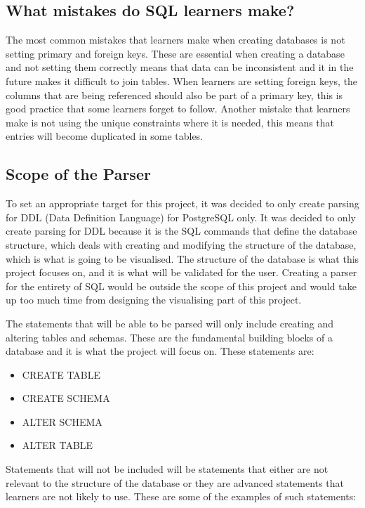\subsection{What mistakes do SQL learners make?}

The most common mistakes that learners make when creating databases is not setting primary and foreign keys. These are essential when creating a database and not setting them correctly means that data can be inconsistent and it in the future makes it difficult to join tables. When learners are setting foreign keys, the columns that are being referenced should also be part of a primary key, this is good practice that some learners forget to follow. Another mistake that learners make is not using the unique constraints where it is needed, this means that entries will become duplicated in some tables. 

\subsection{Scope of the Parser}

To set an appropriate target for this project, it was decided to only create parsing for DDL (Data Definition Language) for PostgreSQL only. It was decided to only create parsing for DDL because it is the SQL commands that define the database structure, which deals with creating and modifying the structure of the database, which is what is going to be visualised. The structure of the database is what this project focuses on, and it is what will be validated for the user. Creating a parser for the entirety of SQL would be outside the scope of this project and would take up too much time from designing the visualising part of this project.

The statements that will be able to be parsed will only include creating and altering tables and schemas. These are the fundamental building blocks of a database and it is what the project will focus on. These statements are:

\begin{itemize}
	\item CREATE TABLE
	\item CREATE SCHEMA
	\item ALTER SCHEMA
	\item ALTER TABLE
\end{itemize}

Statements that will not be included will be statements that either are not relevant to the structure of the database or they are advanced statements that learners are not likely to use. These are some of the examples of such statements:

